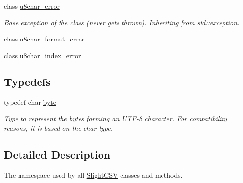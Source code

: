 \begin{DoxyCompactItemize}
class \hyperlink{classutils_1_1u8char__error}{u8char\+\_\+error}
\begin{DoxyCompactList}\small\item\em Base exception of the class (never gets thrown). Inheriting from std\+::exception. \end{DoxyCompactList}\item 
class \hyperlink{classutils_1_1u8char__format__error}{u8char\+\_\+format\+\_\+error}
\item 
class \hyperlink{classutils_1_1u8char__index__error}{u8char\+\_\+index\+\_\+error}
\end{DoxyCompactItemize}
\subsection*{Typedefs}
\begin{DoxyCompactItemize}
\item 
\mbox{\label{namespaceutils_a6ec9293c5f79998946269edb0f6bc028}} 
typedef char \hyperlink{namespaceutils_a6ec9293c5f79998946269edb0f6bc028}{byte}
\begin{DoxyCompactList}\small\item\em Type to represent the bytes forming an U\+T\+F-\/8 character. For compatibility reasons, it is based on the char type. \end{DoxyCompactList}\end{DoxyCompactItemize}


\subsection{Detailed Description}
The namespace used by all \hyperlink{classutils_1_1SlightCSV}{Slight\+C\+SV} classes and methods. 